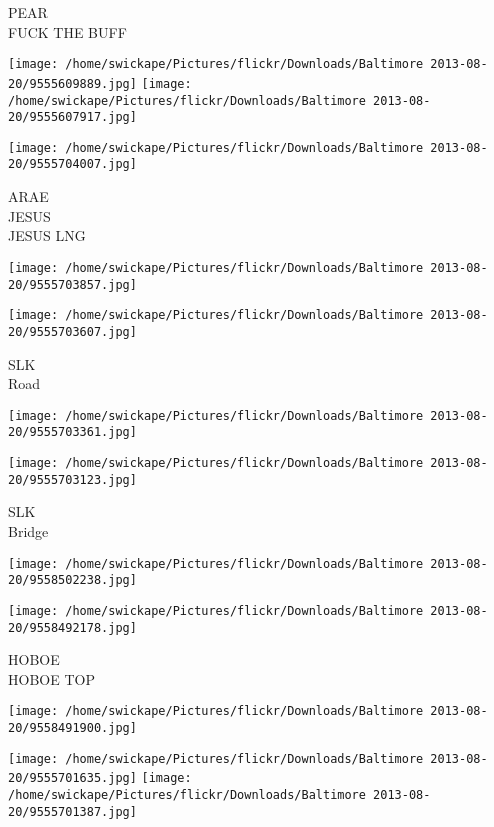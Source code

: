\documentclass[10pt,letterpaper]{article}
\begin{document}
PEAR\\
FUCK THE BUFF\\
\pagebreak

\texttt{[image: /home/swickape/Pictures/flickr/Downloads/Baltimore 2013-08-20/9555609889.jpg]}
\texttt{[image: /home/swickape/Pictures/flickr/Downloads/Baltimore 2013-08-20/9555607917.jpg]}

\texttt{[image: /home/swickape/Pictures/flickr/Downloads/Baltimore 2013-08-20/9555704007.jpg]}

ARAE\\
JESUS\\
JESUS LNG\\
\pagebreak

\texttt{[image: /home/swickape/Pictures/flickr/Downloads/Baltimore 2013-08-20/9555703857.jpg]}

\vspace{0.25in}
\texttt{[image: /home/swickape/Pictures/flickr/Downloads/Baltimore 2013-08-20/9555703607.jpg]}

SLK\\
Road\\
\pagebreak

\texttt{[image: /home/swickape/Pictures/flickr/Downloads/Baltimore 2013-08-20/9555703361.jpg]}

\vspace{0.25in}
\texttt{[image: /home/swickape/Pictures/flickr/Downloads/Baltimore 2013-08-20/9555703123.jpg]}

SLK\\
Bridge\\
\pagebreak

\texttt{[image: /home/swickape/Pictures/flickr/Downloads/Baltimore 2013-08-20/9558502238.jpg]}

\vspace{0.25in}
\texttt{[image: /home/swickape/Pictures/flickr/Downloads/Baltimore 2013-08-20/9558492178.jpg]}

HOBOE\\
HOBOE TOP\\
\pagebreak

\texttt{[image: /home/swickape/Pictures/flickr/Downloads/Baltimore 2013-08-20/9558491900.jpg]}

\vspace{0.25in}
\texttt{[image: /home/swickape/Pictures/flickr/Downloads/Baltimore 2013-08-20/9555701635.jpg]}
\texttt{[image: /home/swickape/Pictures/flickr/Downloads/Baltimore 2013-08-20/9555701387.jpg]}
\end{document}
